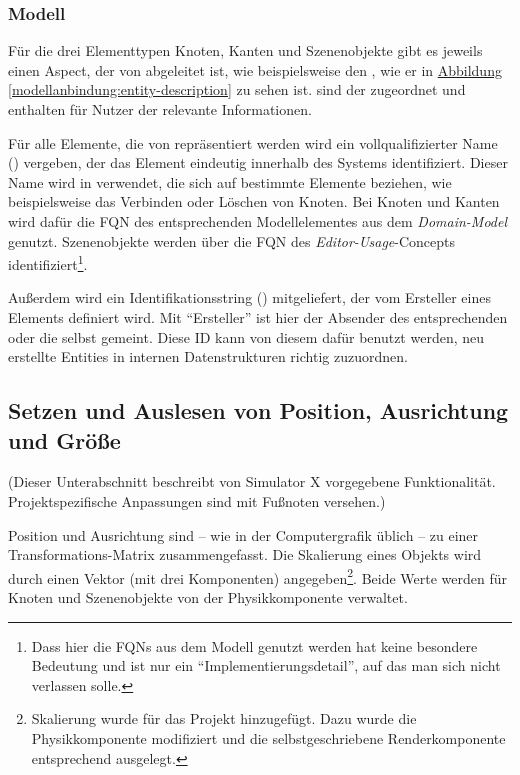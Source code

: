 \documentclass[a4paper,10pt]{sphinxmanual}
\begin{document}
\subsubsection{Modell}
\label{modellanbindung:modell}
Für die drei Elementtypen Knoten, Kanten und Szenenobjekte gibt es jeweils einen Aspect, der von  abgeleitet ist, wie beispielsweise den , wie er in \hyperref[modellanbindung:entity-description]{Abbildung  \ref*{modellanbindung:entity-description}} zu sehen ist.
 sind der  zugeordnet und enthalten für Nutzer der  relevante Informationen.

Für alle Elemente, die von  repräsentiert werden wird ein vollqualifizierter Name () vergeben, der das Element eindeutig innerhalb des Systems identifiziert.
Dieser Name wird in  verwendet, die sich auf bestimmte Elemente beziehen, wie beispielsweise das Verbinden oder Löschen von Knoten.
Bei Knoten und Kanten wird dafür die FQN des entsprechenden Modellelementes aus dem \emph{Domain-Model} genutzt. Szenenobjekte werden über die FQN des \emph{Editor-Usage}-Concepts identifiziert\footnote{
Dass hier die FQNs aus dem Modell genutzt werden hat keine besondere Bedeutung und ist nur ein "`Implementierungsdetail"', auf das man sich nicht verlassen solle.
}.

Außerdem wird ein Identifikationsstring () mitgeliefert, der vom Ersteller eines Elements definiert wird.
Mit "`Ersteller"' ist hier der Absender des entsprechenden  oder die  selbst gemeint.
Diese ID kann von diesem dafür benutzt werden, neu erstellte Entities in internen Datenstrukturen richtig zuzuordnen.


\subsection{Setzen und Auslesen von Position, Ausrichtung und Größe}
\label{modellanbindung:model-svars-transformation}\label{modellanbindung:setzen-und-auslesen-von-position-ausrichtung-und-grosze}
(Dieser Unterabschnitt beschreibt von Simulator X vorgegebene Funktionalität. Projektspezifische Anpassungen sind mit Fußnoten versehen.)

Position und Ausrichtung sind – wie in der Computergrafik üblich \cite{akenine-moller_real-time_2008} – zu einer Transformations-Matrix zusammengefasst.
Die Skalierung eines Objekts wird durch einen Vektor (mit drei Komponenten) angegeben\footnote{
Skalierung wurde für das Projekt hinzugefügt. Dazu wurde die Physikkomponente modifiziert und die selbstgeschriebene Renderkomponente entsprechend ausgelegt.
}.
Beide Werte werden für Knoten und Szenenobjekte von der Physikkomponente verwaltet.
\end{document}
